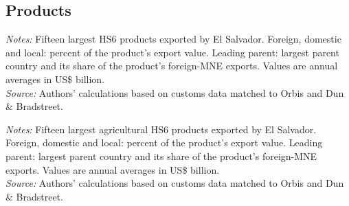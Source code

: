\documentclass[11pt,a4paper]{article}
\begin{document}
\subsection{Products}
\begin{table}[H]\centering\footnotesize%
  \caption{El Salvador: Fifteen Largest Export Products}%
  \label{tab:c_hs6_SLV}%
  \par\vspace{3pt}%
  \begin{minipage}{0.95\textwidth}\footnotesize %
  \textit{Notes:} Fifteen largest HS6 products exported by El Salvador. Foreign, domestic and local: percent of the product's export value. Leading parent: largest parent country and its share of the product's foreign-MNE exports. Values are annual averages in US\$ billion.\\[3pt]%
  \textit{Source:} Authors' calculations based on customs data matched to Orbis and Dun \& Bradstreet.%
  \end{minipage}%
  \end{table}
\begin{table}[H]\centering\footnotesize%
  \caption{El Salvador, Agriculture: Fifteen Largest Export Products}%
  \label{tab:c_hs6_SLV_agro}%
  \par\vspace{3pt}%
  \begin{minipage}{0.95\textwidth}\footnotesize %
  \textit{Notes:} Fifteen largest agricultural HS6 products exported by El Salvador. Foreign, domestic and local: percent of the product's export value. Leading parent: largest parent country and its share of the product's foreign-MNE exports. Values are annual averages in US\$ billion.\\[3pt]%
  \textit{Source:} Authors' calculations based on customs data matched to Orbis and Dun \& Bradstreet.%
  \end{minipage}%
  \end{table}
\end{document}
